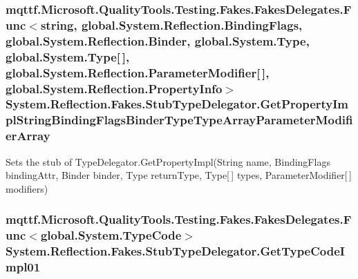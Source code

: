 \hypertarget{class_system_1_1_reflection_1_1_fakes_1_1_stub_type_delegator_a0897abb41dbfd9f5666346f0ac47cda4}{
\subsubsection[{Get\-Property\-Impl\-String\-Binding\-Flags\-Binder\-Type\-Type\-Array\-Parameter\-Modifier\-Array}]{\setlength{\rightskip}{0pt plus 5cm}mqttf.\-Microsoft.\-Quality\-Tools.\-Testing.\-Fakes.\-Fakes\-Delegates.\-Func$<$string, global.\-System.\-Reflection.\-Binding\-Flags, global.\-System.\-Reflection.\-Binder, global.\-System.\-Type, global.\-System.\-Type\mbox{[}$\,$\mbox{]}, global.\-System.\-Reflection.\-Parameter\-Modifier\mbox{[}$\,$\mbox{]}, global.\-System.\-Reflection.\-Property\-Info$>$ System.\-Reflection.\-Fakes.\-Stub\-Type\-Delegator.\-Get\-Property\-Impl\-String\-Binding\-Flags\-Binder\-Type\-Type\-Array\-Parameter\-Modifier\-Array}}\label{class_system_1_1_reflection_1_1_fakes_1_1_stub_type_delegator_a0897abb41dbfd9f5666346f0ac47cda4}


Sets the stub of Type\-Delegator.\-Get\-Property\-Impl(\-String name, Binding\-Flags binding\-Attr, Binder binder, Type return\-Type, Type\mbox{[}$\,$\mbox{]} types, Parameter\-Modifier\mbox{[}$\,$\mbox{]} modifiers)

\hypertarget{class_system_1_1_reflection_1_1_fakes_1_1_stub_type_delegator_a598fd94b97a7398cffc5bb476cbb7b9f}{
\subsubsection[{Get\-Type\-Code\-Impl01}]{\setlength{\rightskip}{0pt plus 5cm}mqttf.\-Microsoft.\-Quality\-Tools.\-Testing.\-Fakes.\-Fakes\-Delegates.\-Func$<$global.\-System.\-Type\-Code$>$ System.\-Reflection.\-Fakes.\-Stub\-Type\-Delegator.\-Get\-Type\-Code\-Impl01}}\label{class_system_1_1_reflection_1_1_fakes_1_1_stub_type_delegator_a598fd94b97a7398cffc5bb476cbb7b9f}


